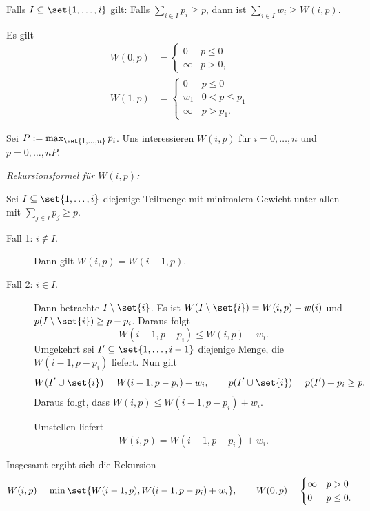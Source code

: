 \documentclass[language=ngerman,algolist]{TemplateLecture}
\begin{document}
Falls $I \subseteq \set{1,\ldots,i}$ gilt: Falls $\sum_{i \in I} p_i \geq p$, dann ist $\sum_{i \in I} w_i \geq W(i, p)$.

Es gilt
\begin{equation*}
    \begin{split}
        W(0,p) &= \begin{cases}
            0 & p \leq 0 \\ 
            \infty & p > 0,
        \end{cases} \\
        W(1,p) &= \begin{cases}
            0 & p \leq 0 \\
            w_1 & 0 < p \leq p_1 \\
            \infty & p > p_1.
        \end{cases}
    \end{split}
\end{equation*}

Sei $P := \max_{\set{1,\ldots,n}} p_i$. Uns interessieren $W(i,p)$ für $i = 0,\ldots,n$ und $p = 0,\ldots,nP$.

\emph{Rekursionsformel für $W(i,p)$:}

Sei $I \subseteq \set{1,\ldots,i}$ diejenige Teilmenge mit minimalem Gewicht unter allen mit $\sum_{j \in I} p_j \geq p$.

\begin{description}
    \item[Fall 1: $i \notin I$.] Dann gilt $W(i,p) = W(i-1,p)$.
    \item[Fall 2: $i \in I$.] Dann betrachte $I \setminus \set{i}$. Es ist $W(I \setminus \set{i}) = W(i,p) - w(i)$ und $p(I \setminus \set{i}) \geq p - p_i$. Daraus folgt 
    \begin{equation*}
        W(i-1, p-p_i) \leq W(i,p) - w_i.
    \end{equation*}
    Umgekehrt sei $I' \subseteq \set{1,\ldots,i-1}$ diejenige Menge, die $W(i-1,p-p_i)$ liefert. Nun gilt
    \begin{equation*}
        W(I' \cup \set{i}) = W(i-1,p-p_i) + w_i, \quad \quad p(I' \cup \set{i}) = p(I') + p_i \geq p.
    \end{equation*}
    Daraus folgt, dass $W(i,p) \leq W(i-1,p-p_i) + w_i$.

    Umstellen liefert 
    \begin{equation*}
        W(i,p) = W(i-1, p-p_i) + w_i.
    \end{equation*}
\end{description}
Insgesamt ergibt sich die Rekursion 
\begin{equation*}
    W(i,p) = \min\set{W(i-1,p), W(i-1,p-p_i) + w_i}, \quad \quad W(0,p) = \begin{cases}
        \infty & p > 0 \\ 
        0 & p \leq 0.
    \end{cases}
\end{equation*}
\end{document}
